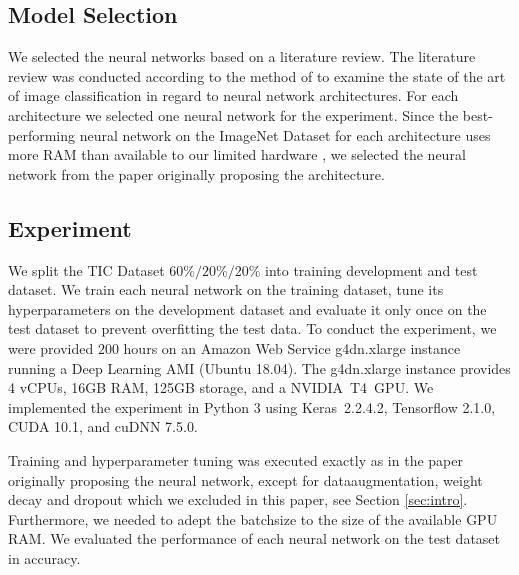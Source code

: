 \documentclass[a4paper, 10pt, journal]{wissarbIEEE}
\begin{document}
\subsection{Model Selection}
We selected the neural networks based on a literature review. The literature review was conducted according to the method of\cite{Webster.2002} to examine the state of the art of image classification in regard to neural network architectures. For each architecture we selected one neural network for the experiment. Since the best-performing neural network on the ImageNet Dataset for each architecture uses more RAM than available to our limited hardware \cite{Foret.2020, Kolesnikov.2019, Touvron.2019}, we selected the neural network from the paper originally proposing the architecture.

\subsection{Experiment}
We split the TIC Dataset $60\%/20\%/20\%$ into training development and test dataset.
We train each neural network on the training dataset, tune its hyperparameters on the development dataset and evaluate it only once on the test dataset to prevent overfitting the test data. To conduct the experiment, we were provided $200$ hours on an Amazon Web Service g4dn.xlarge instance running a Deep Learning AMI (Ubuntu 18.04).\cite{AWS.2020a}
The g4dn.xlarge instance provides 4 vCPUs, 16GB RAM, 125GB storage, and a NVIDIA~T4~GPU. \cite{AWS.2020b} 
We implemented the experiment in Python 3\cite{Python3} using Keras~2.2.4.2\cite{Keras}, Tensorflow 2.1.0\cite{Tensorflow.2015}, CUDA 10.1\cite{CUDA}, and cuDNN 7.5.0\cite{cuDNN}.
\par
Training and hyperparameter tuning was executed exactly as in the paper originally proposing the neural network, except for dataaugmentation, weight decay and dropout which we excluded in this paper, see Section \ref{sec:intro}. Furthermore, we needed to adept the batchsize to the size of the available GPU RAM. We evaluated the performance of each neural network on the test dataset in accuracy.
\end{document}

